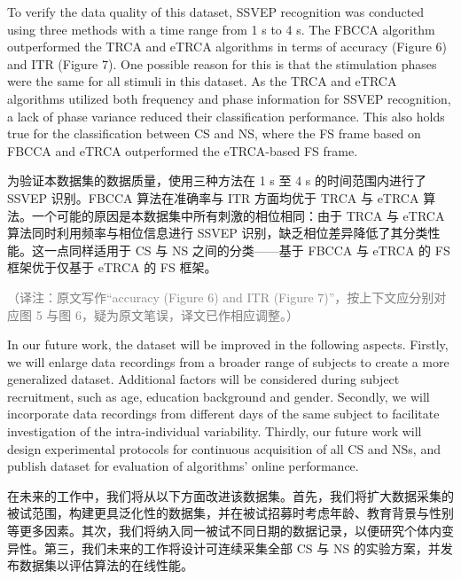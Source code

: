 \documentclass[11pt]{ctexart}
\newenvironment{en}{\begin{enbox}\color{black!85}}{\end{enbox}}
\newenvironment{zh}{\begin{zhbox}}{\end{zhbox}}
\newcommand{\tnote}[1]{\textcolor{gray}{\small（译注：#1）}}
\begin{document}
\begin{en}
To verify the data quality of this dataset, SSVEP recognition was conducted using three methods with a time range from 1 s to 4 s. The FBCCA algorithm outperformed the TRCA and eTRCA algorithms in terms of accuracy (Figure 6) and ITR (Figure 7). One possible reason for this is that the stimulation phases were the same for all stimuli in this dataset. As the TRCA and eTRCA algorithms utilized both frequency and phase information for SSVEP recognition, a lack of phase variance reduced their classification performance. This also holds true for the classification between CS and NS, where the FS frame based on FBCCA and eTRCA outperformed the eTRCA-based FS frame.
\end{en}
\begin{zh}
为验证本数据集的数据质量，使用三种方法在 1 s 至 4 s 的时间范围内进行了 SSVEP 识别。FBCCA 算法在准确率与 ITR 方面均优于 TRCA 与 eTRCA 算法。一个可能的原因是本数据集中所有刺激的相位相同：由于 TRCA 与 eTRCA 算法同时利用频率与相位信息进行 SSVEP 识别，缺乏相位差异降低了其分类性能。这一点同样适用于 CS 与 NS 之间的分类——基于 FBCCA 与 eTRCA 的 FS 框架优于仅基于 eTRCA 的 FS 框架。
\end{zh}
\tnote{原文写作``accuracy (Figure 6) and ITR (Figure 7)''，按上下文应分别对应图 5 与图 6，疑为原文笔误，译文已作相应调整。}

\begin{en}
In our future work, the dataset will be improved in the following aspects. Firstly, we will enlarge data recordings from a broader range of subjects to create a more generalized dataset. Additional factors will be considered during subject recruitment, such as age, education background and gender. Secondly, we will incorporate data recordings from different days of the same subject to facilitate investigation of the intra-individual variability. Thirdly, our future work will design experimental protocols for continuous acquisition of all CS and NSs, and publish dataset for evaluation of algorithms' online performance.
\end{en}
\begin{zh}
在未来的工作中，我们将从以下方面改进该数据集。首先，我们将扩大数据采集的被试范围，构建更具泛化性的数据集，并在被试招募时考虑年龄、教育背景与性别等更多因素。其次，我们将纳入同一被试不同日期的数据记录，以便研究个体内变异性。第三，我们未来的工作将设计可连续采集全部 CS 与 NS 的实验方案，并发布数据集以评估算法的在线性能。
\end{zh}

\end{document}
